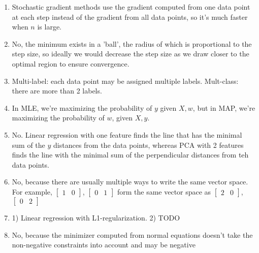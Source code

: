 \documentclass{article}
\def\enum#1{\begin{enumerate}#1\end{enumerate}}
\begin{document}
\enum{
\item Stochastic gradient methods use the gradient computed from one data point at each step instead of the gradient from all data points, so it's much faster when $n$ is large.
\item No, the minimum exists in a 'ball', the radius of which is proportional to the step size, so ideally we would decrease the step size as we draw closer to the optimal region to ensure convergence.
\item Multi-label: each data point may be assigned multiple labels. Mult-class: there are more than 2 labels.
\item In MLE, we're maximizing the probability of $y$ given $X, w$, but in MAP, we're maximizing the probability of $w$, given $X, y$.
\item No. Linear regression with one feature finds the line that has the minimal sum of the $y$ distances from the data points, whereas PCA with 2 features finds the line with the minimal sum of the perpendicular distances from teh data points.
\item No, because there are usually multiple ways to write the same vector space. For example, $\begin{bmatrix}1 & 0\end{bmatrix}$, $\begin{bmatrix}0 & 1\end{bmatrix}$ form the same vector space as $\begin{bmatrix}2 & 0\end{bmatrix}$, $\begin{bmatrix}0 & 2\end{bmatrix}$
\item 1) Linear regression with L1-regularization. 2) TODO
\item No, because the minimizer computed from normal equations doesn't take the non-negative constraints into account and may be negative
}
\end{document}
